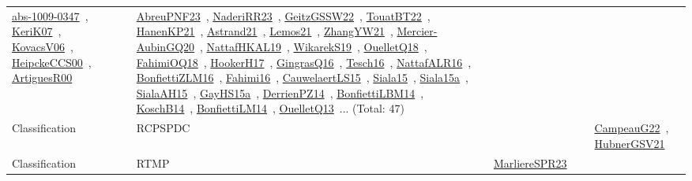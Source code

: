 {\begin{longtable}{lp{3cm}>{\raggedright\arraybackslash}p{6cm}>{\raggedright\arraybackslash}p{6cm}>{\raggedright\arraybackslash}p{8cm}}
\href{../works/abs-1009-0347.pdf}{abs-1009-0347}~\cite{abs-1009-0347}, \href{../works/KeriK07.pdf}{KeriK07}~\cite{KeriK07}, \href{../works/KovacsV06.pdf}{KovacsV06}~\cite{KovacsV06}, \href{../works/HeipckeCCS00.pdf}{HeipckeCCS00}~\cite{HeipckeCCS00}, \href{../works/ArtiguesR00.pdf}{ArtiguesR00}~\cite{ArtiguesR00} & \href{../works/AbreuPNF23.pdf}{AbreuPNF23}~\cite{AbreuPNF23}, \href{../works/NaderiRR23.pdf}{NaderiRR23}~\cite{NaderiRR23}, \href{../works/GeitzGSSW22.pdf}{GeitzGSSW22}~\cite{GeitzGSSW22}, \href{../works/TouatBT22.pdf}{TouatBT22}~\cite{TouatBT22}, \href{../works/HanenKP21.pdf}{HanenKP21}~\cite{HanenKP21}, \href{../works/Astrand21.pdf}{Astrand21}~\cite{Astrand21}, \href{../works/Lemos21.pdf}{Lemos21}~\cite{Lemos21}, \href{../works/ZhangYW21.pdf}{ZhangYW21}~\cite{ZhangYW21}, \href{../works/Mercier-AubinGQ20.pdf}{Mercier-AubinGQ20}~\cite{Mercier-AubinGQ20}, \href{../works/NattafHKAL19.pdf}{NattafHKAL19}~\cite{NattafHKAL19}, \href{../works/WikarekS19.pdf}{WikarekS19}~\cite{WikarekS19}, \href{../works/OuelletQ18.pdf}{OuelletQ18}~\cite{OuelletQ18}, \href{../works/FahimiOQ18.pdf}{FahimiOQ18}~\cite{FahimiOQ18}, \href{../works/HookerH17.pdf}{HookerH17}~\cite{HookerH17}, \href{../works/GingrasQ16.pdf}{GingrasQ16}~\cite{GingrasQ16}, \href{../works/Tesch16.pdf}{Tesch16}~\cite{Tesch16}, \href{../works/NattafALR16.pdf}{NattafALR16}~\cite{NattafALR16}, \href{../works/BonfiettiZLM16.pdf}{BonfiettiZLM16}~\cite{BonfiettiZLM16}, \href{../works/Fahimi16.pdf}{Fahimi16}~\cite{Fahimi16}, \href{../works/CauwelaertLS15.pdf}{CauwelaertLS15}~\cite{CauwelaertLS15}, \href{../works/Siala15.pdf}{Siala15}~\cite{Siala15}, \href{../works/Siala15a.pdf}{Siala15a}~\cite{Siala15a}, \href{../works/SialaAH15.pdf}{SialaAH15}~\cite{SialaAH15}, \href{../works/GayHS15a.pdf}{GayHS15a}~\cite{GayHS15a}, \href{../works/DerrienPZ14.pdf}{DerrienPZ14}~\cite{DerrienPZ14}, \href{../works/BonfiettiLBM14.pdf}{BonfiettiLBM14}~\cite{BonfiettiLBM14}, \href{../works/KoschB14.pdf}{KoschB14}~\cite{KoschB14}, \href{../works/BonfiettiLM14.pdf}{BonfiettiLM14}~\cite{BonfiettiLM14}, \href{../works/OuelletQ13.pdf}{OuelletQ13}~\cite{OuelletQ13}... (Total: 47)\\
Classification & RCPSPDC &  &  & \href{../works/CampeauG22.pdf}{CampeauG22}~\cite{CampeauG22}, \href{../works/HubnerGSV21.pdf}{HubnerGSV21}~\cite{HubnerGSV21}\\
Classification & RTMP & \href{../works/MarliereSPR23.pdf}{MarliereSPR23}~\cite{MarliereSPR23} &  & \\

\end{longtable}}
